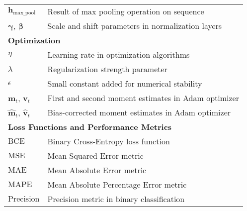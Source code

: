 \begin{appendices}
\begin{table}[htbp]
{\begin{tabular}{p{}p{}}
        $\bm{h}_{\text{max\_pool}}$                 & Result of max pooling operation on sequence                                          \\
        $\bm{\gamma}$, $\bm{\beta}$                 & Scale and shift parameters in normalization layers                                   \\
        \midrule
        \multicolumn{2}{l}{\textbf{Optimization}}                                                                                          \\
        \midrule
        $\eta$                                      & Learning rate in optimization algorithms                                             \\
        $\lambda$                                   & Regularization strength parameter                                                    \\
        $\epsilon$                                  & Small constant added for numerical stability                                         \\
        $\bm{m}_t$, $\bm{v}_t$                      & First and second moment estimates in Adam optimizer                                  \\
        $\hat{\bm{m}}_t$, $\hat{\bm{v}}_t$          & Bias-corrected moment estimates in Adam optimizer                                    \\
        \midrule
        \multicolumn{2}{l}{\textbf{Loss Functions and Performance Metrics}}                                                                \\
        \midrule
        $\text{BCE}$                                & Binary Cross-Entropy loss function                                                   \\
        $\text{MSE}$                                & Mean Squared Error metric                                                            \\
        $\text{MAE}$                                & Mean Absolute Error metric                                                           \\
        $\text{MAPE}$                               & Mean Absolute Percentage Error metric                                                \\
        $\text{Precision}$                          & Precision metric in binary classification                                            \\

\end{tabular}}
\end{table}
\end{appendices}
